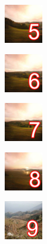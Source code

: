 \begin{task}
\begin{gridlayout}{\textwidth}{12cm}
        \begin{row}{0.33}
            \begin{cell}{0.25}
                \centering
                \includegraphics[width=0.9\cellwidth]{doc-one/img/thumbnail-5.png}
            \end{cell}
            \begin{cell}{0.25}
                \centering
                \includegraphics[width=0.9\cellwidth]{doc-one/img/thumbnail-6.png}
            \end{cell}
            \begin{cell}{0.25}
                \centering
                \includegraphics[width=0.9\cellwidth]{doc-one/img/thumbnail-7.png}
            \end{cell}
            \begin{cell}{0.25}
                \centering
                \includegraphics[width=0.9\cellwidth]{doc-one/img/thumbnail-8.png}
            \end{cell}
        \end{row}
        \begin{row}{0.34}
            \begin{cell}{0.25}
                \centering
                \includegraphics[width=0.9\cellwidth]{doc-one/img/thumbnail-9.png}
            \end{cell}
            \begin{cell}{0.25}

\end{cell}
\end{row}
\end{gridlayout}
\end{task}
